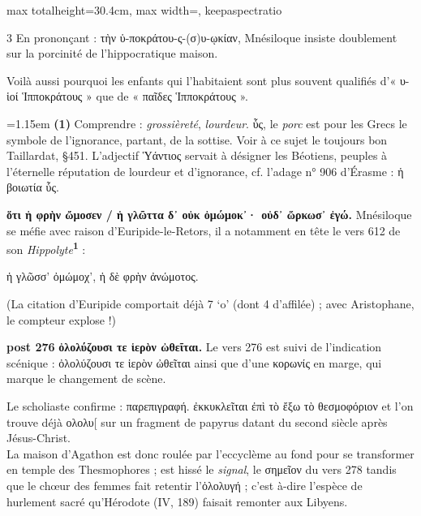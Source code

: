 \documentclass[11pt,twoside]{book}
\newcommand{\italique}[1]{\textit{#1}}
\newcommand{\citComm}[1]{\begin{quoting}[vskip=0.4pt,leftmargin=0.7em,rightmargin=0.2em]#1\end{quoting}}
\newcommand{\grec}[1]{{\policeGr #1}}
\newcommand{\marqueur}[1]{\textsuperscript{\color{rubricRed}\textbf{#1}}}
\begin{document}
\begin{adjustbox}{max totalheight=30.4cm, max width=\textwidth, keepaspectratio}
\begin{minipage}{\textwidth}
{\begin{multicols}{3}
\noindent En prononçant : \grec{τὴν ὑ-ποκράτου-ς-(σ)υ-ῳκίαν}, Mnésiloque insiste doublement sur la porcinité de l'hippocratique maison.
\par\vspace{1.5pt}
\noindent Voilà aussi pourquoi les enfants qui l'habitaient sont plus souvent qualifiés d'« \grec{υ-ἱοί Ἱπποκράτους} » que de « παῖδες Ἱπποκράτους ».
\par\vspace{1.5pt}
\par\vspace{1.2pt}\par\nopagebreak\vspace{1pt}\noindent\hangindent=1.15em {\color{sepiaNote}\textbf{(1)}} Comprendre : \italique{grossièreté}, \italique{lourdeur}. ὗς, le \italique{porc} est pour les Grecs le symbole de l'ignorance, partant, de la sottise. Voir à ce sujet le toujours bon Taillardat, §451. L'adjectif Ὑάντιος servait à désigner les Béotiens, peuples à l'éternelle réputation de lourdeur et d'ignorance, cf. l'adage n° 906 d'Érasme : ἡ βοιωτία ὗς.
\par\vspace{1.5pt}
 \textbf{ὅτι ἡ φρὴν ὤμοσεν / ἡ γλῶττα δ᾽ οὐκ ὀμώμοκ᾽· οὐδ᾽ ὥρκωσ᾽ ἐγώ.} Mnésiloque se méfie avec raison d'Euripide-le-Retors, il a notamment en tête le vers 612 de son \italique{Hippolyte}\marqueur{1} :
\citComm{ἡ γλῶσσ' ὀμώμοχ', ἡ δὲ φρὴν ἀνώμοτος.}
\par\vspace{1.5pt}
\noindent (La citation d'Euripide comportait déjà 7 `o' (dont 4 d'affilée) ; avec Aristophane, le compteur explose !)
\par\vspace{1.5pt}
\noindent\textbf{post 276} \textbf{ὀλολύζουσι τε ἱερὸν ὠθεῖται.} Le vers 276 est suivi de l'indication scénique : ὀλολύζουσι τε ἱερὸν ὠθεῖται ainsi que d'une κορωνίς en marge, qui marque le changement de scène.
\par\vspace{1.5pt}
\noindent Le scholiaste confirme : παρεπιγραφή. ἐκκυκλεῖται ἐπὶ τὸ ἔξω τὸ θεσμοφόριον et l'on trouve déjà ολολυ[ sur un fragment de papyrus datant du second siècle après Jésus-Christ.\\ La maison d'Agathon est donc roulée par l'eccyclème au fond pour se transformer en temple des Thesmophores ; est hissé le \italique{signal}, le σημεῖον du vers 278 tandis que le chœur des femmes fait retentir l'ὀλολυγή ; c'est à-dire l'espèce de hurlement sacré qu'Hérodote (IV, 189) faisait remonter aux Libyens.

\end{multicols}}
\end{minipage}
\end{adjustbox}
\end{document}

